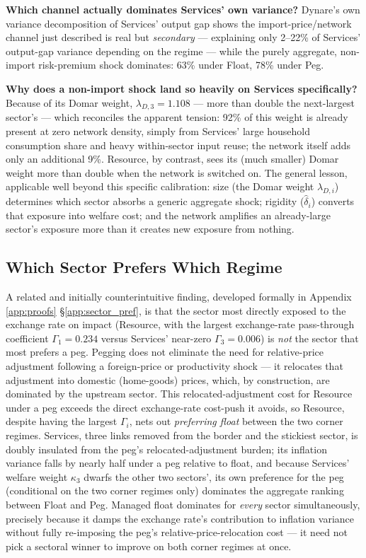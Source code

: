 \documentclass[12pt]{article}
\begin{document}
\textbf{Which channel actually dominates Services' own variance?} Dynare's own variance decomposition
of Services' output gap shows the import-price/network channel just described is real but
\emph{secondary} --- explaining only 2--22\% of Services' output-gap variance depending on the regime
--- while the purely aggregate, non-import risk-premium shock dominates: 63\% under Float, 78\% under
Peg.

\textbf{Why does a non-import shock land so heavily on Services specifically?} Because of its Domar
weight, $\lambda_{D,3}=1.108$ --- more than double the next-largest sector's --- which reconciles the
apparent tension: 92\% of this weight is already present at zero network density, simply from
Services' large household consumption share and heavy within-sector input reuse; the network itself
adds only an additional 9\%. Resource, by contrast, sees its (much smaller) Domar weight more than
double when the network is switched on. The general lesson, applicable well beyond this specific
calibration: size (the Domar weight $\lambda_{D,i}$) determines which sector absorbs a generic
aggregate shock; rigidity ($\hat\delta_i$) converts that exposure into welfare cost; and the network
amplifies an already-large sector's exposure more than it creates new exposure from nothing.

\subsection{Which Sector Prefers Which Regime}

A related and initially counterintuitive finding, developed formally in Appendix
\ref{app:proofs} \S\ref{app:sector_pref}, is that the sector most directly exposed to the exchange
rate on impact (Resource, with the largest exchange-rate pass-through coefficient $\Gamma_1=0.234$
versus Services' near-zero $\Gamma_3=0.006$) is \emph{not} the sector that most prefers a peg. Pegging
does not eliminate the need for relative-price adjustment following a foreign-price or productivity
shock --- it relocates that adjustment into domestic (home-goods) prices, which, by construction, are
dominated by the upstream sector. This relocated-adjustment cost for Resource under a peg exceeds the
direct exchange-rate cost-push it avoids, so Resource, despite having the largest $\Gamma_i$, nets out
\emph{preferring float} between the two corner regimes. Services, three links removed from the
border and the stickiest sector, is doubly insulated from the peg's relocated-adjustment burden;
its inflation variance falls by nearly half under a peg relative to float, and because Services'
welfare weight $\kappa_3$ dwarfs the other two sectors', its own preference for the peg (conditional
on the two corner regimes only) dominates the aggregate ranking between Float and Peg. Managed float
dominates for \emph{every} sector simultaneously, precisely because it damps the exchange rate's
contribution to inflation variance without fully re-imposing the peg's relative-price-relocation
cost --- it need not pick a sectoral winner to improve on both corner regimes at once.
\end{document}
